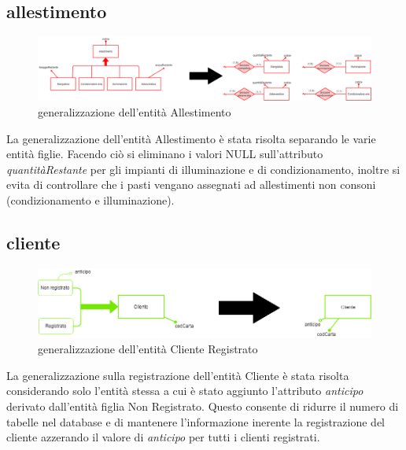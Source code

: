 \documentclass[12pt,a4paper]{article}
\begin{document}
\subsection{allestimento}
\begin{figure}[H]
\centering
\includegraphics[scale=2, width=1.15\textwidth]{ridondanze/allestimento.png}
\caption{ge\-ne\-ra\-liz\-za\-zio\-ne dell'entità Allestimento}
\end{figure}
La ge\-ne\-ra\-liz\-za\-zio\-ne dell'entità Allestimento è stata risolta separando le varie entità figlie. Facendo ciò si eliminano i valori NULL sull'attributo \textit{quantitàRestante} per gli impianti di illuminazione e di condizionamento, inoltre si evita di controllare che i pasti vengano assegnati ad allestimenti non consoni (condizionamento e illuminazione).
\subsection{cliente}
\begin{figure}[H]
\centering
\includegraphics[scale=2, width=1.15\textwidth]{ridondanze/cliente.png}
\caption{ge\-ne\-ra\-liz\-za\-zio\-ne dell'entità Cliente Registrato}
\end{figure}
La ge\-ne\-ra\-liz\-za\-zio\-ne sulla registrazione dell'entità Cliente è stata risolta considerando solo l'entità stessa a cui è stato aggiunto l'attributo \textit{anticipo} derivato dall'entità figlia Non Registrato. Questo consente di ridurre il numero di tabelle nel database e di mantenere l'informazione inerente la registrazione del cliente azzerando il valore di \textit{anticipo} per tutti i clienti registrati.
\end{document}
